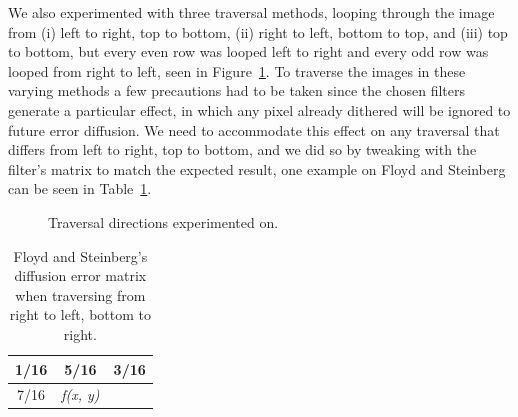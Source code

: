 \documentclass[conference]{IEEEtran}
\begin{document}
We also experimented with three traversal methods, looping through the image from (i) left to right, top to bottom, (ii) right to left, bottom to top, and (iii) top to bottom, but every even row was looped left to right and every odd row was looped from right to left, seen in Figure~\ref{fig:traversal}. To traverse the images in these varying methods a few precautions had to be taken since the chosen filters generate a particular effect, in which any pixel already dithered will be ignored to future error diffusion. We need to accommodate this effect on any traversal that differs from left to right, top to bottom, and we did so by tweaking with the filter's matrix to match the expected result, one example on Floyd and Steinberg can be seen in Table~\ref{tab:flo_inverse}.
\begin{figure}[htbp]
	\centering
	\quad
	\quad
	\caption{Traversal directions experimented on.}
	\label{fig:traversal}
\end{figure}
\begin{table}[!h]
\centering
\renewcommand{\arraystretch}{1.5}
\begin{tabular}{c|c|c}
1/16 & 5/16             & 3/16 \\ \hline
7/16 & \textit{f(x, y)} &     
\end{tabular}
\caption{Floyd and Steinberg's diffusion error matrix when traversing from right to left, bottom to right.}
\label{tab:flo_inverse}
\end{table}
\end{document}
